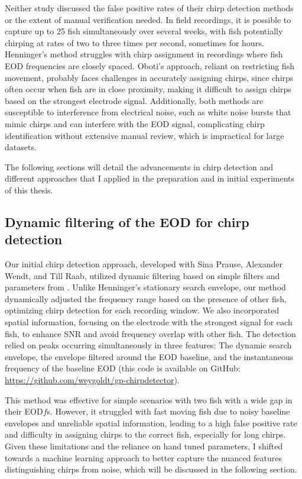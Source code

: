 Neither study discussed the false positive rates of their chirp detection
methods or the extent of manual verification needed. In field recordings, it is
possible to capture up to 25 fish simultaneously over several weeks, with fish
potentially chirping at rates of two to three times per second, sometimes for
hours. Henninger's method struggles with chirp assignment in recordings where
fish EOD frequencies are closely spaced. Oboti's approach, reliant on
restricting fish movement, probably faces challenges in accurately assigning
chirps, since chirps often occur when fish are in close proximity, making it
difficult to assign chirps based on the strongest electrode signal.
Additionally, both methods are susceptible to interference from electrical
noise, such as white noise bursts that mimic chirps and can interfere with the
EOD signal, complicating chirp identification without extensive manual review,
which is impractical for large datasets.

The following sections will detail the advancements in chirp detection and
different approaches that I applied in the preparation and in initial
experiments of this thesis.

\subsection{Dynamic filtering of the EOD for chirp detection}
\label{sec:filterdetector}

Our initial chirp detection approach, developed with Sina Prause, Alexander
Wendt, and Till Raab, utilized dynamic filtering based on simple filters and
parameters from \textcite{henningerStatisticsNaturalCommunication2018}. Unlike
Henninger's stationary search envelope, our method dynamically adjusted the
frequency range based on the presence of other fish, optimizing chirp detection
for each recording window. We also incorporated spatial information, focusing
on the electrode with the strongest signal for each fish, to enhance
\acrfull{SNR} and avoid frequency overlap with other fish. The detection relied
on peaks occurring simultaneously in three features: The dynamic search
envelope, the envelope filtered around the EOD baseline, and the instantaneous
frequency of the baseline EOD (this code is available on GitHub:
\url{https://github.com/weygoldt/gp-chirpdetector}).

This method was effective for simple scenarios with two fish with a wide gap in
their EOD$f$s. However, it struggled with fast moving fish due to noisy
baseline envelopes and unreliable spatial information, leading to a high false
positive rate and difficulty in assigning chirps to the correct fish,
especially for long chirps. Given these limitations and the reliance on
hand tuned parameters, I shifted towards a machine learning approach to better
capture the nuanced features distinguishing chirps from noise, which will be
discussed in the following section.

